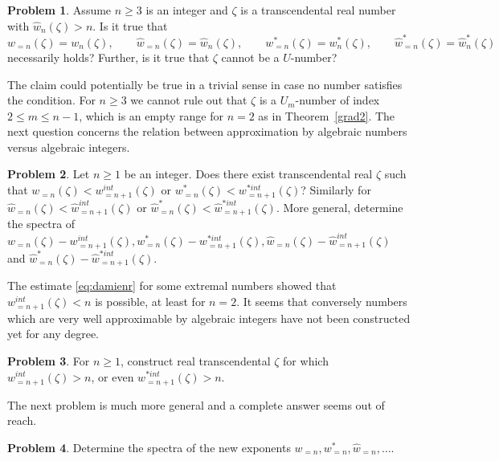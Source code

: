 \documentclass[12pt]{amsart}
\theoremstyle{definition}
\newtheorem{problem}{Problem}
\begin{document}
\begin{problem} \label{p3e}
Assume $n\geq 3$ is an integer and $\zeta$ is a transcendental real number with $\widehat{w}_{n}(\zeta)>n$. 
Is it true that
%
\[
w_{=n}(\zeta)= w_{n}(\zeta), \qquad \widehat{w}_{=n}(\zeta)= \widehat{w}_{n}(\zeta), \qquad w_{=n}^{\ast}(\zeta)=w_{n}^{\ast}(\zeta),
\qquad \widehat{w}_{=n}^{\ast}(\zeta)= \widehat{w}_{n}^{\ast}(\zeta)
\]
%
necessarily holds? Further, is it true that $\zeta$ cannot
be a $U$-number?
\end{problem}

The claim could potentially be true in a trivial sense in case no 
number satisfies the condition.
For $n\geq 3$ we cannot rule out that $\zeta$ is a $U_{m}$-number of index $2\leq m\leq n-1$, which is an empty 
range for $n=2$ as in Theorem~\ref{grad2}.
The next question concerns the relation between approximation by algebraic numbers
versus algebraic integers.

\begin{problem} \label{problem4}
Let $n\geq 1$ be an integer.
Does there exist transcendental real $\zeta$ such 
that $w_{=n}(\zeta)<w_{=n+1}^{int}(\zeta)$ or $w_{=n}^{\ast}(\zeta)<w_{=n+1}^{\ast int}(\zeta)$?
Similarly for $\widehat{w}_{=n}(\zeta)<\widehat{w}_{=n+1}^{int}(\zeta)$ or $\widehat{w}_{=n}^{\ast}(\zeta)<\widehat{w}_{=n+1}^{\ast int}(\zeta)$.
More general, determine the spectra of $w_{=n}(\zeta)-w_{=n+1}^{int}(\zeta), w_{=n}^{\ast}(\zeta)-w_{=n+1}^{\ast int}(\zeta),
\widehat{w}_{=n}(\zeta)-\widehat{w}_{=n+1}^{int}(\zeta)$ and $\widehat{w}_{=n}^{\ast}(\zeta)-\widehat{w}_{=n+1}^{\ast int}(\zeta)$.
\end{problem}


The estimate \eqref{eq:damienr} for some extremal numbers showed that $w_{=n+1}^{int}(\zeta)<n$ is possible, at least for $n=2$.
It seems that conversely numbers which are very well approximable by algebraic integers have not been constructed yet for any degree.

\begin{problem}
For $n\geq 1$, construct real transcendental $\zeta$ for which $w_{=n+1}^{int}(\zeta)>n$, or even $w_{=n+1}^{\ast int}(\zeta)>n$.
\end{problem}

The next problem is much more general and a complete answer seems out of reach.

\begin{problem}
Determine the spectra of the new exponents $w_{=n}, w_{=n}^{\ast}, \widehat{w}_{=n},\ldots$.
\end{problem}
\end{document}
